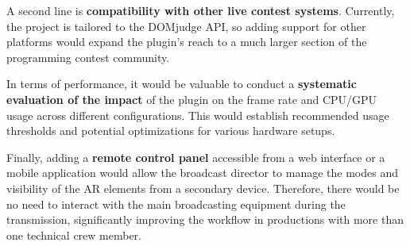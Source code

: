 A second line is \textbf{compatibility with other live contest systems}. Currently, the project is tailored to the DOMjudge API, so adding support for other platforms would expand the plugin's reach to a much larger section of the programming contest community.

In terms of performance, it would be valuable to conduct a \textbf{systematic evaluation of the impact} of the plugin on the frame rate and CPU/GPU usage across different configurations. This would establish recommended usage thresholds and potential optimizations for various hardware setups.

Finally, adding a \textbf{remote control panel} accessible from a web interface or a mobile application would allow the broadcast director to manage the modes and visibility of the AR elements from a secondary device. Therefore, there would be no need to interact with the main broadcasting equipment during the transmission, significantly improving the workflow in productions with more than one technical crew member.